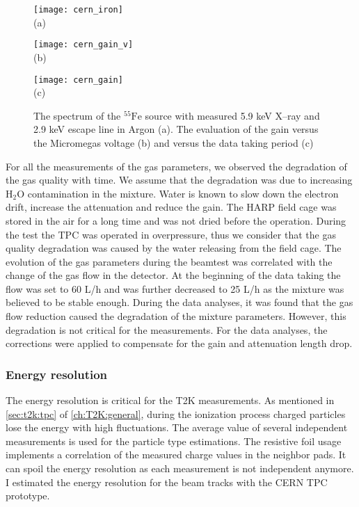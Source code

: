 \documentclass[../main.tex]{subfiles}
\begin{document}
\begin{figure}[!ht]
  \centering
  \begin{minipage}{0.33\linewidth}
    \centering
    \texttt{[image: cern\_iron]} \\ (a)
  \end{minipage}
  \begin{minipage}{0.33\linewidth}
    \centering
    \texttt{[image: cern\_gain\_v]} \\ (b)
  \end{minipage}
  \begin{minipage}{0.33\linewidth}
    \centering
    \texttt{[image: cern\_gain]} \\ (c)
  \end{minipage}
  \caption{The spectrum of the ${}^{55}\text{Fe}$ source with measured 5.9 keV X--ray and 2.9 keV escape line in Argon (a). The evaluation of the gain versus the Micromegas voltage (b) and versus the data taking period (c)}
  \label{fig:tpc:cern_gain}
\end{figure}

For all the measurements of the gas parameters, we observed the degradation of the gas quality with time. We assume that the degradation was due to increasing $\text{H}_2\text{O}$ contamination in the mixture. Water is known to slow down the electron drift, increase the attenuation and reduce the gain. The HARP field cage was stored in the air for a long time and was not dried before the operation. During the test the TPC was operated in overpressure, thus we consider that the gas quality degradation was caused by the water releasing from the field cage. The evolution of the gas parameters during the beamtest was correlated with the change of the gas flow in the detector. At the beginning of the data taking the flow was set to 60 L/h and was further decreased to 25 L/h as the mixture was believed to be stable enough. During the data analyses, it was found that the gas flow reduction caused the degradation of the mixture parameters. However, this degradation is not critical for the measurements. For the data analyses, the corrections were applied to compensate for the gain and attenuation length drop.

\subsubsection{Energy resolution}
\label{sec:tpc:tpc_dedx}
The energy resolution is critical for the T2K measurements. As mentioned in \autoref{sec:t2k:tpc} of \autoref{ch:T2K:general}, during the ionization process charged particles lose the energy with high fluctuations. The average value of several independent measurements is used for the particle type estimations. The resistive foil usage implements a correlation of the measured charge values in the neighbor pads. It can spoil the energy resolution as each measurement is not independent anymore. I estimated the energy resolution for the beam tracks with the CERN TPC prototype.
\end{document}
